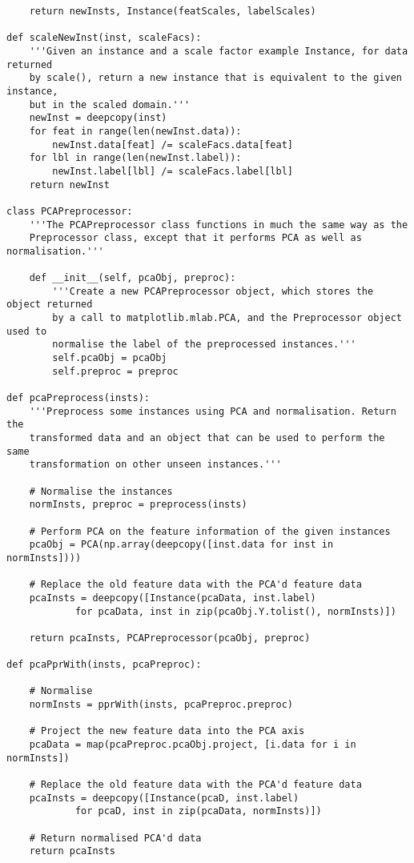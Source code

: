 \documentclass{article}
\begin{document}
\begin{verbatim}
    return newInsts, Instance(featScales, labelScales)

def scaleNewInst(inst, scaleFacs):
    '''Given an instance and a scale factor example Instance, for data returned
    by scale(), return a new instance that is equivalent to the given instance,
    but in the scaled domain.'''
    newInst = deepcopy(inst)
    for feat in range(len(newInst.data)):
        newInst.data[feat] /= scaleFacs.data[feat]
    for lbl in range(len(newInst.label)):
        newInst.label[lbl] /= scaleFacs.label[lbl]
    return newInst

class PCAPreprocessor:
    '''The PCAPreprocessor class functions in much the same way as the
    Preprocessor class, except that it performs PCA as well as normalisation.'''

    def __init__(self, pcaObj, preproc):
        '''Create a new PCAPreprocessor object, which stores the object returned
        by a call to matplotlib.mlab.PCA, and the Preprocessor object used to
        normalise the label of the preprocessed instances.'''
        self.pcaObj = pcaObj
        self.preproc = preproc

def pcaPreprocess(insts):
    '''Preprocess some instances using PCA and normalisation. Return the
    transformed data and an object that can be used to perform the same
    transformation on other unseen instances.'''

    # Normalise the instances
    normInsts, preproc = preprocess(insts)

    # Perform PCA on the feature information of the given instances
    pcaObj = PCA(np.array(deepcopy([inst.data for inst in normInsts])))

    # Replace the old feature data with the PCA'd feature data
    pcaInsts = deepcopy([Instance(pcaData, inst.label)
            for pcaData, inst in zip(pcaObj.Y.tolist(), normInsts)])

    return pcaInsts, PCAPreprocessor(pcaObj, preproc)

def pcaPprWith(insts, pcaPreproc):

    # Normalise
    normInsts = pprWith(insts, pcaPreproc.preproc)

    # Project the new feature data into the PCA axis
    pcaData = map(pcaPreproc.pcaObj.project, [i.data for i in normInsts])

    # Replace the old feature data with the PCA'd feature data
    pcaInsts = deepcopy([Instance(pcaD, inst.label)
            for pcaD, inst in zip(pcaData, normInsts)])

    # Return normalised PCA'd data
    return pcaInsts

\end{verbatim}
\end{document}
